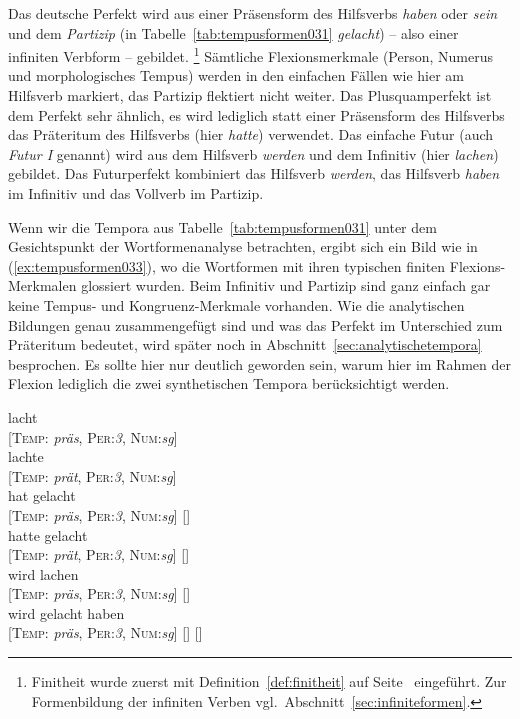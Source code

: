 
Das deutsche Perfekt wird aus einer Präsensform des Hilfsverbs \textit{haben} oder \textit{sein} und dem \textit{Partizip} (in Tabelle~\ref{tab:tempusformen031} \textit{gelacht}) -- also einer infiniten Verbform -- gebildet.%
\footnote{Finitheit wurde zuerst mit Definition~\ref{def:finitheit} auf Seite~\pageref{def:finitheit} eingeführt.
Zur Formenbildung der infiniten Verben vgl.\ Abschnitt~\ref{sec:infiniteformen}.}
Sämtliche Flexionsmerkmale (Person, Numerus und morphologisches Tempus) werden in den einfachen Fällen wie hier am Hilfsverb markiert, das Partizip flektiert nicht weiter.
Das Plusquamperfekt ist dem Perfekt sehr ähnlich, es wird lediglich statt einer Präsensform des Hilfsverbs das Präteritum des Hilfsverbs (hier \textit{hatte}) verwendet.
Das einfache Futur (auch \textit{Futur I} genannt) wird aus dem Hilfsverb \textit{werden} und dem Infinitiv (hier \textit{lachen}) gebildet.
Das Futurperfekt kombiniert das Hilfsverb \textit{werden}, das Hilfsverb \textit{haben} im Infinitiv und das Vollverb im Partizip.

Wenn wir die Tempora aus Tabelle~\ref{tab:tempusformen031} unter dem Gesichtspunkt der Wortformenanalyse betrachten, ergibt sich ein Bild wie in (\ref{ex:tempusformen033}), wo die Wortformen mit ihren typischen finiten Flexions-Merkmalen glossiert wurden.
Beim Infinitiv und Partizip sind ganz einfach gar keine Tempus- und Kongruenz-Merkmale vorhanden.
Wie die analytischen Bildungen genau zusammengefügt sind und was \zB das Perfekt im Unterschied zum Präteritum bedeutet, wird später noch in Abschnitt~\ref{sec:analytischetempora} besprochen.
Es sollte hier nur deutlich geworden sein, warum hier im Rahmen der Flexion lediglich die zwei synthetischen Tempora berücksichtigt werden.

\begin{exe}
  \ex\label{ex:tempusformen033}
  \begin{xlist}
    \ex\gll lacht \\
    {[\textsc{Temp}: \textit{präs}, \textsc{Per}:\textit{3}, \textsc{Num}:\textit{sg}]}\\
    \ex\gll lachte \\
    {[\textsc{Temp}: \textit{prät}, \textsc{Per}:\textit{3}, \textsc{Num}:\textit{sg}]}\\
    \ex\gll hat gelacht\\
    {[\textsc{Temp}: \textit{präs}, \textsc{Per}:\textit{3}, \textsc{Num}:\textit{sg}]} {[]}\\
    \ex\gll hatte gelacht\\
    {[\textsc{Temp}: \textit{prät}, \textsc{Per}:\textit{3}, \textsc{Num}:\textit{sg}]} {[]}\\
    \ex\gll wird lachen\\
    {[\textsc{Temp}: \textit{präs}, \textsc{Per}:\textit{3}, \textsc{Num}:\textit{sg}]} {[]}\\
    \ex\gll wird gelacht haben \\
    {[\textsc{Temp}: \textit{präs}, \textsc{Per}:\textit{3}, \textsc{Num}:\textit{sg}]} {[]} {[]}\\
  \end{xlist}
\end{exe}

